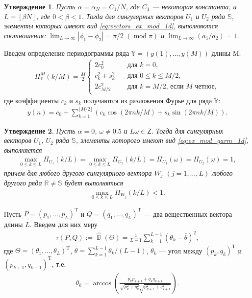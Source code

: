 \documentclass[specialist,
               substylefile = spbu.rtx,
               subf,href,colorlinks=true, 12pt]{disser}
\def\mod{\mathop{\mathrm{mod}}}
\DeclareMathOperator{\D}{\mathbb{D}}
\newtheorem{Th}{Утверждение}
\begin{document}
\begin{Th}  \cite[Утверждение 8]{Zhornikova2016} \label{th:aboutU1U2_ex_mod_1d}
Пусть $\alpha = \alpha_N = C_1/N$, где $C_1$ --- некоторая константа, и $L=[\beta N]$, где $0<\beta<1$. Тогда для сингулярных векторов $U_1$ и $U_2$ ряда $\mathbb{S}$, элементы которых имеют вид \eqref{eq:vectors_ex_mod_1d}, выполняются соотношения: $\lim_{L \rightarrow \infty}{|\phi_1-\phi_2|}=\pi/2 \,\,(\mod \pi)$ и $\lim_{L \rightarrow \infty}{(a_1/a_2)} = 1$.
\end{Th}


Введем определение периодограммы ряда $\mathbb{Y}=(y(1),\ldots,y({M}))$ длины M:
\begin{gather}
\label{eq:per} 
 \Pi_{\mathbb{Y}}^M(k/M) = \frac{M}{2}
\begin{cases}
2c_0^2 &\quad \text{для } k = 0, \\
c_k^2 + s_k^2 & \quad \text{для }  0 \leqslant k \leqslant M/2, \\
2c_{M/2}^2 & \quad \text{для } k = M/2   \text{, если } M \text{ четное},
\end{cases} 
\end{gather}
где коэффициенты $c_k$ и $s_k$ получаются из разложения Фурье для ряда $\mathbb{Y}$:
\begin{gather*}
y(n) = c_0 + \sum_{k=1}^{\lfloor M/2 \rfloor}\left(c_k\cos(2\pi n k /M) + s_k\sin(2\pi n k/M) \right).
\end{gather*}

\begin{Th}  \cite[Утверждение 3.1]{Alexandrov2006} \label{th:aleks1}
Пусть $\alpha = 0$, $\omega \not = 0.5$ и $L\omega \in \mathsf{Z}$. Тогда для сингулярных векторов $U_1$, $U_2$ ряда $\mathbb{S}$, элементы которого имеют вид \eqref{eq:ex_mod_garm_1d}, выполняется  
\begin{gather*}
\max_{0 \leqslant k \leqslant L} \Pi_{U_1}(k/L) = \max_{0 \leqslant k \leqslant L} \Pi_{U_2}(k/L) =  \Pi_{U_1}(\omega) =  \Pi_{U_2}(\omega) = 1,
\end{gather*}
причем для любого другого сингулярного вектора $W_j$ $(j = 1,\ldots, L)$ любого другого ряда $\mathbb{R} \not = \mathbb{S}$ будет выполняться
\begin{gather*}
\max_{0 \leqslant k \leqslant L} \Pi_{W_j}(k/L) < 1.
\end{gather*}
\end{Th}

Пусть $P = (p_1,\ldots,p_L)^{\mathrm{T}}$ и $Q=(q_1,\ldots,q_L)^{\mathrm{T}}$ --- два вещественных вектора длины $L$. Введем для них меру 
\begin{gather} \label{eq:tau1} 
\tau(P, Q) := \hat{\D}(\Theta) =\frac{1}{L-1}\sum_{k=1}^{L-1}{\left(\theta_k  - \bar{\theta}\right)^2},
\end{gather}
где $\Theta=(\theta_1,\ldots,\theta_L)^{\mathrm{T}}$,
$\bar{\theta} = \sum_{k=1}^{L-1}{\theta_k}/(L-1)$, $\theta_k$ --- угол между  
$\left(p_k, q_{k}\right)^{\mathrm{T}}$ и $\left(p_{k+1}, q_{k+1}\right)^{\mathrm{T}}$, т.е.
\begin{gather*}
\theta_k = \arccos{\left(\frac{p_{k} p_{k+1} + q_{k} q_{k+1}}{\sqrt{p_{k}^2+q_{k}^2}\sqrt{p_{k+1}^2+q_{k+1}^2}}\right)}.
\end{gather*}
\end{document}
